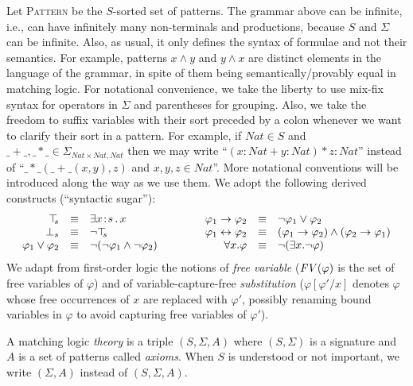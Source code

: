 \documentclass[UTF8,11pt]{article}
\theoremstyle{plain}
\theoremstyle{definition}
\theoremstyle{remark}
\newcommand{\cln}{{:}}
\newcommand{\Nat}{\textit{Nat}}
\newcommand{\Pattern}{\textsc{Pattern}\xspace}
\newcommand{\ra}{\rightarrow}
\newcommand{\lra}{\leftrightarrow}
\newcommand{\FV}{{\it FV}}
\begin{document}
Let \Pattern be the $S$-sorted set of patterns.
The grammar above can be infinite, i.e., can have infinitely many
non-terminals and productions, because $S$ and $\Sigma$ can be
infinite.
Also, as usual, it only defines the syntax of formulae and not
their semantics.
For example, patterns $x \wedge y$ and $y \wedge x$ are distinct elements in
the language of the grammar, in spite of them being semantically/provably
equal in matching logic.
For notational convenience, we take the liberty to use mix-fix syntax for
operators in $\Sigma$ and parentheses for grouping.
Also, we take the freedom to suffix variables with their sort preceded
by a colon whenever we want to clarify their sort in a pattern.
For example, if $\Nat \in S$ and
$\_+\_, \_*\_ \in \Sigma_{\Nat \times \Nat, \Nat}$
then we may write ``$(x\cln\Nat + y\cln\Nat)*z\cln\Nat$'' instead of
``$\_*\_(\_+\_(x,y),z)$ and $x,y,z\in\Nat$''.
More notational conventions will be introduced along the way
as we use them. 
We adopt the following derived constructs (``syntactic sugar''): %
$$\begin{array}{rcl@{\hspace*{10ex}}rcl}
\top_{\!\!s} & \equiv & \exists x\!:\!s \,.\, x &
\varphi_1 \ra \varphi_2 & \equiv & \neg\varphi_1 \vee \varphi_2 \\
\bot_{s} & \equiv & \neg \top_{\!\!s} &
\varphi_1 \lra \varphi_2 & \equiv & (\varphi_1 \ra \varphi_2) \wedge
 (\varphi_2 \ra \varphi_1) \\
\varphi_1 \vee \varphi_2 & \equiv & \neg(\neg\varphi_1\wedge\neg\varphi_2) &
\forall x . \varphi & \equiv & \neg(\exists x . \neg\varphi) \\
\end{array}
$$
We adapt from first-order logic the notions of \emph{free variable}
($\FV(\varphi)$ is the set of free variables of $\varphi$) and of
variable-capture-free \emph{substitution} ($\varphi[\varphi'/x]$ denotes
$\varphi$ whose free occurrences of $x$ are replaced with $\varphi'$, possibly
renaming bound variables in $\varphi$ to avoid capturing free variables of
$\varphi'$).

A matching logic \emph{theory} is a triple $(S, \Sigma, A)$ where
$(S,\Sigma)$ is a signature and $A$ is a set of patterns called \emph{axioms}.
When $S$ is understood or not important, we write $(\Sigma,A)$ instead of $(S,\Sigma,A)$.
\end{document}

